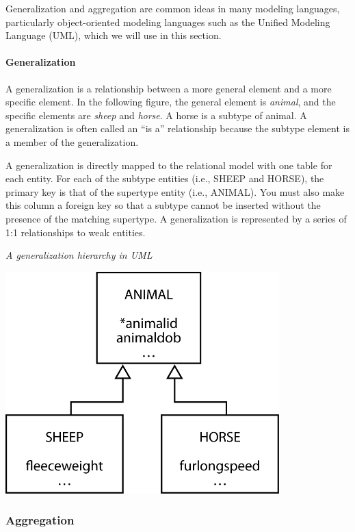 \documentclass[
]{article}
\begin{document}
Generalization and aggregation are common ideas in many modeling
languages, particularly object-oriented modeling languages such as the
Unified Modeling Language (UML), which we will use in this section.

\hypertarget{generalization}{%
\paragraph*{Generalization}\label{generalization}}

A generalization is a relationship between a more general element and a
more specific element. In the following figure, the general element is
\emph{animal}, and the specific elements are \emph{sheep} and \emph{horse}. A horse is
a subtype of animal. A generalization is often called an ``is a''
relationship because the subtype element is a member of the
generalization.

A generalization is directly mapped to the relational model with one
table for each entity. For each of the subtype entities (i.e., SHEEP and
HORSE), the primary key is that of the supertype entity (i.e., ANIMAL).
You must also make this column a foreign key so that a subtype cannot be
inserted without the presence of the matching supertype. A
generalization is represented by a series of 1:1 relationships to weak
entities.

\emph{A generalization hierarchy in UML}

\includegraphics[width=4.16667in,height=\textheight]{Figures/Chapter 7/generalizationanimal.png}

\hypertarget{aggregation}{%
\subsubsection*{Aggregation}\label{aggregation}}
\end{document}
